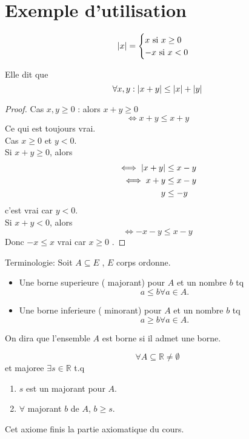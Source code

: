 \documentclass[../main.tex]{subfiles}
\begin{document}
\section{Exemple d'utilisation}
\begin{defn}\label{defn:valeur_absolue}
	\[ 
		\left\vert x\right\vert = 
		\begin{cases}
			x \text{ si } x \geq 0\\
			-x \text{ si } x < 0\\
		\end{cases}
	\]
\end{defn}
\begin{propo}
	Elle dit que
	\[ 
		\forall x,y : \left\vert x + y\right\vert \leq \left\vert x\right\vert + \left\vert y\right\vert
	\]
\end{propo}
\begin{proof}
Cas $x,y \geq 0$ : alors $x+y \geq 0$ 
\[ 
\iff x+y \leq x + y
\]
Ce qui est toujours vrai.\\
Cas $x\geq 0 $ et $y < 0$.\\
Si $x+y \geq 0$, alors
\begin{align*}
	\iff \left\vert x+y\right\vert &\leq x -y\\
	\iff x+ y &\leq x-y\\
	y &\leq -y
\end{align*}
c'est vrai car $y<0$.\\
Si $x+y < 0$, alors 
\[ 
\iff -x-y \leq x -y
\]
Donc $ -x \leq x$ vrai car $x \geq 0$ .

\end{proof}
\begin{defn}[Bornes]\label{defn:bornes}
	Terminologie: Soit $A \subseteq E$ , $E$ corps ordonne.
	\begin{itemize}
		\item Une borne superieure ( majorant) pour $A$ et un nombre $b$ tq
			\[ 
			a \leq b \forall a \in A.
			\]
		\item Une borne inferieure ( minorant) pour $A$ et un nombre $b$ tq
			\[ 
			a \geq b \forall a \in A.		
			\]
	\end{itemize}
	On dira que l'ensemble $A$ est borne si il admet une borne.
\end{defn}
\begin{axiom}\label{axiom:axiome_de_completude}
	\[ 
	\forall A \subseteq \mathbb{R} \neq \emptyset
	\]
	et majoree $\exists s \in \mathbb{R}$ t.q
	\begin{enumerate}
		\item $s$ est un majorant pour $A$.\\
		\item $\forall$ majorant $b$ de $A$, $b \geq s$.
	\end{enumerate}
	Cet axiome finis la partie axiomatique du cours.
\end{axiom}
\end{document}
